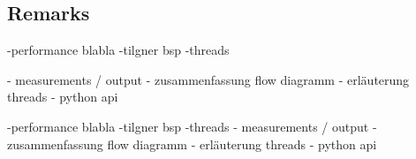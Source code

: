 \subsection{Remarks}

-performance blabla
-tilgner bsp
-threads

- measurements / output
- zusammenfassung flow diagramm
- erläuterung threads
- python api

-performance blabla
-tilgner bsp
-threads
- measurements / output
- zusammenfassung flow diagramm
- erläuterung threads
- python api





